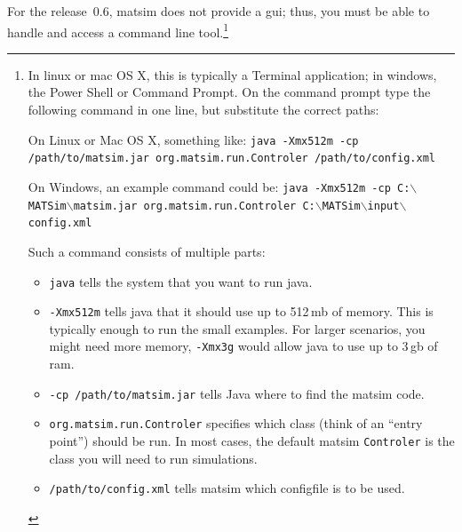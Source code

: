 For the release~0.6, \gls{matsim} does not provide a \gls{gui}; thus, you must be able to handle and access a command line tool.\footnote{%
%
\baselineskip
\parindent0pt
%
In \gls{linux} or \gls{mac} OS X, this is typically a Terminal application; in \gls{windows}, the Power Shell or Command Prompt.
%
On the command prompt type the following command in one line, but substitute the correct paths: 

On Linux or Mac OS X, something like:
\lstinline|java -Xmx512m -cp /path/to/matsim.jar org.matsim.run.Controler /path/to/config.xml|


On Windows, an example command could be: 
\lstinline{java -Xmx512m -cp C:}$\backslash$\lstinline{MATSim}$\backslash$\lstinline{matsim.jar org.matsim.run.Controler C:}$\backslash$\lstinline{MATSim}$\backslash$\lstinline{input}$\backslash$\lstinline{config.xml}

Such a command consists of multiple parts:
\begin{itemize}\styleItemize
\item \lstinline|java| tells the system that you want to run \gls{java}.
\item \lstinline|-Xmx512m| tells \gls{java} that it should use up to 512\,\gls{mb} of memory. This is typically enough to run the small examples. For larger \glspl{scenario}, you might need more memory, \eg \lstinline|-Xmx3g| would allow \gls{java} to use up to 3\,\gls{gb} of \gls{ram}.
\item \lstinline|-cp /path/to/matsim.jar| tells Java where to find the \gls{matsim} code.
\item \lstinline|org.matsim.run.Controler| specifies which class (think of an ``entry point'') should be run. In most cases, the default \gls{matsim} \lstinline|Controler| is the class you will need to run simulations.
\item \lstinline|/path/to/config.xml| tells \gls{matsim} which \gls{configfile} is to be used. 
\end{itemize}
}

